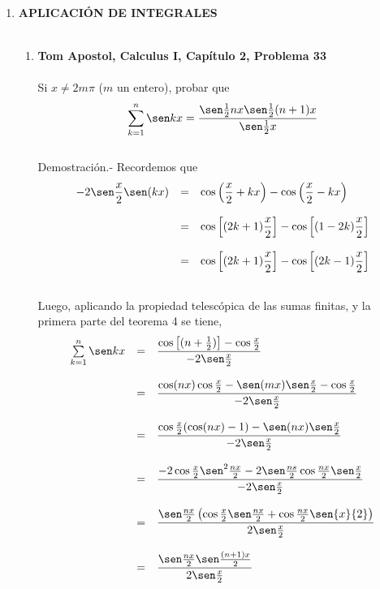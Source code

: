\begin{enumerate}
\begin{enumerate}[\bfseries a)]
    \end{enumerate}

\newpage

\item \textbf{\large APLICACIÓN DE INTEGRALES}\\\\

    \begin{enumerate}[\bfseries a)]

	\item \textbf{\large Tom Apostol, Calculus I, Capítulo 2, Problema 33}\\\\
	Si $x\neq 2m\pi$ ($m$ un entero), probar que 
	    $$\sum\limits_{k=1}^n \sen kx = \dfrac{\sen\frac{1}{2} nx \sen\frac{1}{2}(n+1)x}{\sen\frac{1}{2}x}$$\\
	    Demostración.-\; Recordemos que 
	    $$\begin{array}{rcl}
	    -2\sen\dfrac{x}{2}\sen(kx)&=&\cos\left(\dfrac{x}{2}+kx\right) - \cos\left(\dfrac{x}{2}-kx\right)\\\\
				      &=&\cos\left[(2k+1)\dfrac{x}{2}\right]-\cos\left[(1-2k)\dfrac{x}{2}\right]\\\\
				      &=&\cos \left[(2k+1)\dfrac{x}{2}\right]-\cos\left[(2k-1)\dfrac{x}{2}\right]\\\\
	    \end{array}$$
	    
	    Luego, aplicando la propiedad telescópica de las sumas finitas, y la primera parte del teorema 4 se tiene,
	    $$\begin{array}{rcl}
		\sum\limits_{k=1}^n \sen kx&=&\dfrac{\cos \left[(n+\frac{1}{2})\right]-\cos \frac{x}{2}}{-2\sen \frac{x}{2}}\\\\
					   &=&\dfrac{\cos(nx)\cos \frac{x}{2}-\sen(mx)\sen \frac{x}{2}-\cos \frac{x}{2}}{-2\sen \frac{x}{2}}\\\\
					   &=&\dfrac{\cos\frac{x}{2}(\cos(nx)-1)-\sen (nx) \sen \frac{x}{2}}{-2\sen \frac{x}{2}}\\\\
					   &=&\dfrac{-2\cos \frac{x}{2}\sen^2 \frac{nx}{2} - 2\sen \frac{ns}{2} \cos \frac{nx}{2} \sen \frac{x}{2}}{-2\sen \frac{x}{2}}\\\\
					   &=&\dfrac{\sen \frac{nx}{2}\left(\cos \frac{x}{2} \sen \frac{nx}{2} + \cos \frac{nx}{2} \sen{x}{2}\right)}{2\sen \frac{x}{2}}\\\\
					   &=&\dfrac{\sen \frac{nx}{2} \sen \frac{(n+1)x}{2}}{2\sen \frac{x}{2}}\\\\
	    \end{array}$$


\end{enumerate}
\end{enumerate}
